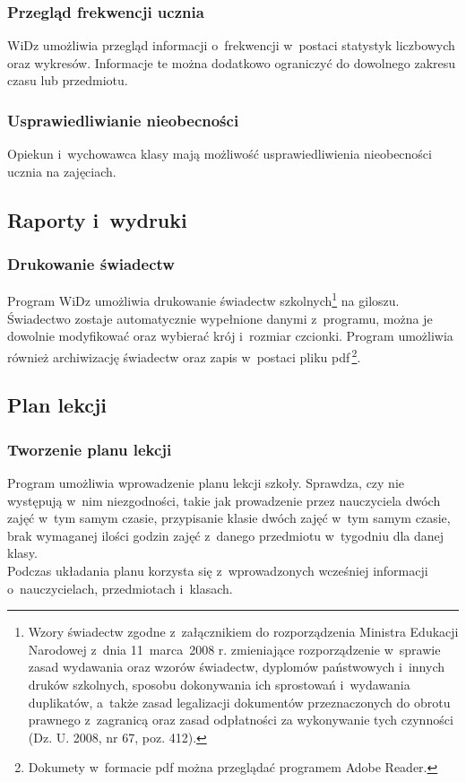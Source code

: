 \documentclass[12pt,leqno,twoside]{mwart}
\begin{document}
\subsubsection{Przegląd frekwencji ucznia}
\noindent WiDz umożliwia przegląd informacji o~frekwencji w~postaci statystyk liczbowych oraz wykresów. Informacje te można dodatkowo ograniczyć do dowolnego zakresu czasu lub przedmiotu.

\subsubsection{Usprawiedliwianie nieobecności}
\noindent Opiekun i~wychowawca klasy mają możliwość usprawiedliwienia nieobecności ucznia na zajęciach.

\subsection{Raporty i~wydruki}
\subsubsection{Drukowanie świadectw} 
\noindent Program WiDz umożliwia drukowanie świadectw szkolnych\footnote{Wzory świadectw zgodne z~załącznikiem do rozporządzenia Ministra Edukacji Narodowej z~dnia 11~marca~2008 r. zmieniające rozporządzenie w~sprawie zasad wydawania oraz wzorów świadectw, dyplomów państwowych i~innych druków szkolnych, sposobu dokonywania ich sprostowań i~wydawania duplikatów, a~także zasad legalizacji dokumentów przeznaczonych do obrotu prawnego z~zagranicą oraz zasad odpłatności za wykonywanie tych czynności (Dz. U. 2008, nr 67, poz. 412).} na giloszu. Świadectwo zostaje automatycznie wypełnione danymi z~programu, można je dowolnie modyfikować oraz wybierać krój i~rozmiar czcionki. Program umożliwia również archiwizację świadectw oraz zapis w~postaci pliku pdf\,\footnote{Dokumety w~formacie pdf można przeglądać programem Adobe Reader.}.

\subsection{Plan lekcji}
\subsubsection{Tworzenie planu lekcji}
\noindent Program umożliwia wprowadzenie planu lekcji szkoły. Sprawdza, czy nie występują w~nim niezgodności, takie jak prowadzenie przez nauczyciela dwóch zajęć w~tym samym czasie, przypisanie klasie dwóch zajęć w~tym samym czasie, brak wymaganej ilości godzin zajęć z~danego przedmiotu w~tygodniu dla danej klasy.\\
\indent Podczas układania planu korzysta się z~wprowadzonych wcześniej informacji o~nauczycielach, przedmiotach i~klasach.
\end{document}
